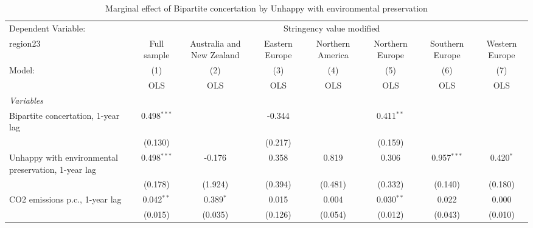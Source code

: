 
\begin{table}[htbp]
   \caption{Marginal effect of Bipartite concertation by Unhappy with environmental preservation}
   \centering
   \begin{tabular}{lccccccc}
      \toprule
      Dependent Variable: & \multicolumn{7}{c}{Stringency value modified}\\
      region23                                                                                 & Full sample    & Australia and New Zealand & Eastern Europe & Northern America & Northern Europe & Southern Europe & Western Europe \\   
      Model:                                                                                   & (1)            & (2)                       & (3)            & (4)              & (5)             & (6)             & (7)\\  
                                                                                               &  OLS           & OLS                       & OLS            & OLS              & OLS             & OLS             & OLS\\  
      \midrule
      \emph{Variables}\\
      Bipartite concertation, 1-year lag                                                       & 0.498$^{***}$  &                           & -0.344         &                  & 0.411$^{**}$    &                 &   \\   
                                                                                               & (0.130)        &                           & (0.217)        &                  & (0.159)         &                 &   \\   
      Unhappy with environmental preservation, 1-year lag                                      & 0.498$^{***}$  & -0.176                    & 0.358          & 0.819            & 0.306           & 0.957$^{***}$   & 0.420$^{*}$\\   
                                                                                               & (0.178)        & (1.924)                   & (0.394)        & (0.481)          & (0.332)         & (0.140)         & (0.180)\\   
      CO2 emissions p.c., 1-year lag                                                           & 0.042$^{**}$   & 0.389$^{*}$               & 0.015          & 0.004            & 0.030$^{**}$    & 0.022           & 0.000\\   
                                                                                               & (0.015)        & (0.035)                   & (0.126)        & (0.054)          & (0.012)         & (0.043)         & (0.010)\\   

\end{tabular}
\end{table}
